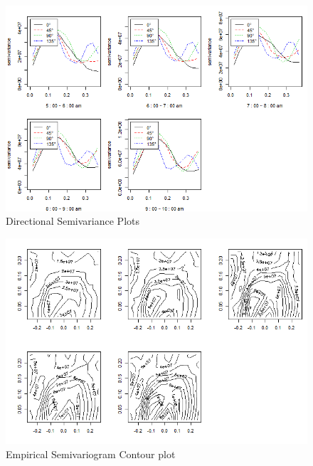 \documentclass[hidelinks,12pt]{article}
\begin{document}
	\begin{figure}[!ht]
		\includegraphics[width=\textwidth]{dir_semi.png}
		\caption{Directional Semivariance Plots\label{fig:dir_semi}}
	\end{figure}
	\FloatBarrier
	
	\begin{figure}[!ht]
		\includegraphics[width=\textwidth]{esc.png}
		\caption{Empirical Semivariogram Contour plot\label{fig:esc}}
	\end{figure}
	\FloatBarrier
	
\end{document}
